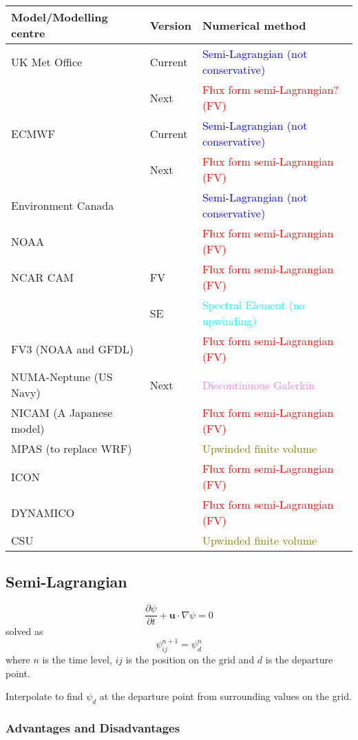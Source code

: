 \begin{tabular}{lll}
\textbf{Model/Modelling centre} & \textbf{Version} & \textbf{Numerical method}\tabularnewline
\hline 
UK Met Office & Current & \textcolor{blue}{Semi-Lagrangian (not conservative)}\tabularnewline
 & Next & \textcolor{red}{Flux form semi-Lagrangian? (FV)}\tabularnewline
\hline 
ECMWF & Current & \textcolor{blue}{Semi-Lagrangian (not conservative)}\tabularnewline
 & Next & \textcolor{red}{Flux form semi-Lagrangian (FV)}\tabularnewline
\hline 
Environment Canada &  & \textcolor{blue}{Semi-Lagrangian (not conservative)}\tabularnewline
\hline 
NOAA &  & \textcolor{red}{Flux form semi-Lagrangian (FV)}\tabularnewline
\hline 
NCAR CAM & FV & \textcolor{red}{Flux form semi-Lagrangian (FV)}\tabularnewline
 & SE & \textcolor{cyan}{Spectral Element (no upwinding)}\tabularnewline
\hline 
FV3 (NOAA and GFDL) &  & \textcolor{red}{Flux form semi-Lagrangian (FV)}\tabularnewline
\hline 
NUMA-Neptune (US Navy) & Next & \textcolor{violet}{Discontinuous Galerkin}\tabularnewline
\hline 
NICAM (A Japanese model) &  & \textcolor{red}{Flux form semi-Lagrangian (FV)}\tabularnewline
\hline 
MPAS (to replace WRF) &  & \textcolor{olive}{Upwinded finite volume}\tabularnewline
\hline 
ICON &  & \textcolor{red}{Flux form semi-Lagrangian (FV)}\tabularnewline
\hline 
DYNAMICO &  & \textcolor{red}{Flux form semi-Lagrangian (FV)}\tabularnewline
\hline 
CSU &  & \textcolor{olive}{Upwinded finite volume}\tabularnewline
\end{tabular}

\clearpage{}

\subsection{Semi-Lagrangian}

\begin{minipage}[t]{0.6\columnwidth}%
\[
\frac{\partial\psi}{\partial t}+\mathbf{u}\cdot\nabla\psi=0
\]
solved as
\[
\psi_{ij}^{n+1}=\psi_{d}^{n}
\]
where $n$ is the time level, $ij$ is the position on the grid and
$d$ is the departure point. 

Interpolate to find $\psi_{d}$ at the departure point from surrounding
values on the grid.%
\end{minipage} %
\begin{minipage}[t]{0.38\columnwidth}%
\phantom{}\resizebox{1\textwidth}{!}{}%
\end{minipage}

\subsubsection*{Advantages and Disadvantages}
\begin{description}
\item [{\smiley{}}] 
\item [{\smiley{}}] 
\item [{\frownie{}}] 
\end{description}
\clearpage{}

